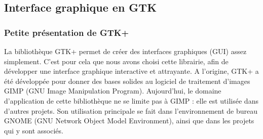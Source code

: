 \documentclass[a4paper,12pt]{article}
\begin{document}
	\subsection{Interface graphique en GTK}

		\subsubsection{Petite présentation de GTK+}
La bibliothèque GTK+ permet de créer des interfaces graphiques (GUI) assez
simplement. C'est pour cela que nous avons choisi cette librairie, afin de
développer une interface graphique interactive et attrayante. A l'origine, GTK+
a été développée pour donner des bases solides au logiciel de traitement
d'images GIMP (GNU Image Manipulation Program). Aujourd'hui, le domaine
d'application de cette bibliothèque ne se limite pas à GIMP : elle est utilisée
dans d'autres projets. Son utilisation principale se fait dans l'environnement
de bureau GNOME (GNU
Network Object Model Environment), ainsi que dans les projets qui y sont
associés.
\end{document}

